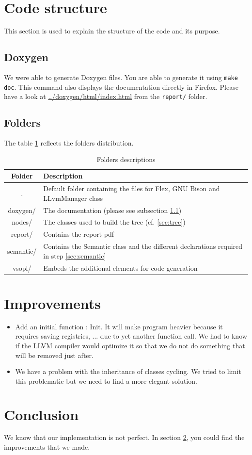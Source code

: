 \documentclass[a4paper,11pt]{article}
\begin{document}
  \section{Code structure}
    This section is used to explain the structure of the code and its purpose.

\subsection{Doxygen}
  \label{Doxygen}
  We were able to generate Doxygen files. You are able to generate it using \texttt{make doc}. This command also displays the documentation directly in Firefox.
  Please have a look at \url{../doxygen/html/index.html} from the \texttt{report/} folder.
  \subsection{Folders}
    The table \ref{fig:folders} reflects the folders distribution.
    \begin{table}[H]
      \begin{tabular}{|c|p{10cm}|}
      \hline
      Folder & Description\\
      \hline\hline
      . &  Default folder containing the files for Flex, GNU Bison and LLvmManager class  \\\hline
      doxygen/ & The documentation (please see subsection \ref{Doxygen}) \\\hline
      nodes/ & The classes used to build the tree (cf. \ref{sec:tree})\\\hline
      report/ & Contains the report pdf\\\hline
      semantic/ & Contains the Semantic class and the different declarations required in step \ref{sec:semantic}\\\hline
      vsopl/ & Embeds the additional elements for code generation \\\hline
      \end{tabular}
      \caption{\label{fig:folders}Folders descriptions}
    \end{table}
    
\section{Improvements}
  \label{sec:improvements}
  \begin{itemize}
  \item Add an initial function : Init. It will make program heavier because it requires saving registries, ... 
  due to yet another function call. We had to know if the LLVM compiler would optimize it so that we do not 
  do something that will be removed just after.
  \item We have a problem with the inheritance of classes cycling. We tried to limit this problematic but we need to find
  a more elegant solution.
  \end{itemize}


\section{Conclusion}

  We know that our implementation is not perfect. In section \ref{sec:improvements}, you could find the improvements that we made.
\end{document}
